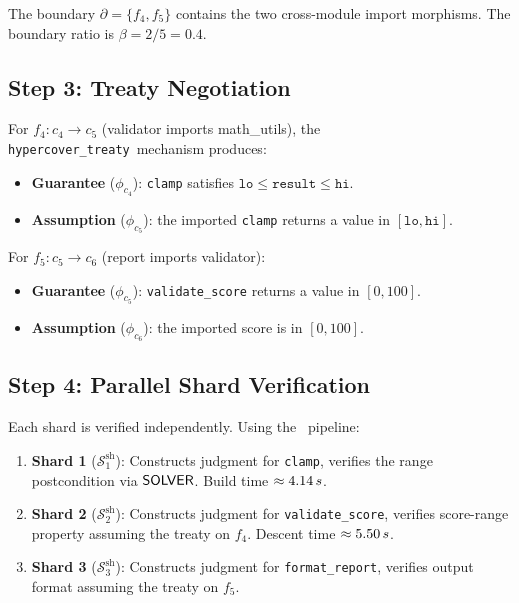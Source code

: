\documentclass[11pt]{article}
\newcommand{\ShardSite}{\mathcal{S}^{\mathrm{sh}}}
\newcommand{\HypercoverTreaty}{\texttt{hypercover\_treaty}}
\begin{document}
The boundary $\partial = \{f_4, f_5\}$ contains the two cross-module
import morphisms.  The boundary ratio is $\beta = 2/5 = 0.4$.

\subsection{Step 3: Treaty Negotiation}

For $f_4\colon c_4 \to c_5$ (validator imports math\_utils), the
\HypercoverTreaty\ mechanism produces:
\begin{itemize}[noitemsep]
  \item \textbf{Guarantee} ($\phi_{c_4}$): \texttt{clamp} satisfies
        $\texttt{lo} \le \texttt{result} \le \texttt{hi}$.
  \item \textbf{Assumption} ($\phi_{c_5}$): the imported \texttt{clamp}
        returns a value in $[\texttt{lo}, \texttt{hi}]$.
\end{itemize}

For $f_5\colon c_5 \to c_6$ (report imports validator):
\begin{itemize}[noitemsep]
  \item \textbf{Guarantee} ($\phi_{c_5}$): \texttt{validate\_score}
        returns a value in $[0, 100]$.
  \item \textbf{Assumption} ($\phi_{c_6}$): the imported score is
        in $[0, 100]$.
\end{itemize}

\subsection{Step 4: Parallel Shard Verification}

Each shard is verified independently.  Using the \JuGeo\ pipeline:
\begin{enumerate}[noitemsep]
  \item \textbf{Shard 1} ($\ShardSite_1$): Constructs judgment for
        \texttt{clamp}, verifies the range postcondition via
        $\mathsf{SOLVER}$.  Build time $\approx4.14\,s$.
  \item \textbf{Shard 2} ($\ShardSite_2$): Constructs judgment for
        \texttt{validate\_score}, verifies score-range property
        assuming the treaty on $f_4$.  Descent time
        $\approx5.50\,s$.
  \item \textbf{Shard 3} ($\ShardSite_3$): Constructs judgment for
        \texttt{format\_report}, verifies output format assuming the
        treaty on $f_5$.
\end{enumerate}
\end{document}
